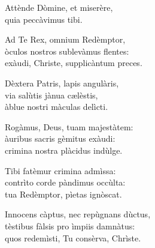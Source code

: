 
\strofa Attènde Dòmine, et miserère,\\
quia peccàvimus tibi.

\spazio


\spazio

\strofa Ad Te Rex, omnium Redèmptor,\\
òculos nostros sublevàmus flentes:\\
exàudi, Christe, supplicàntum preces.

\spazio


\spazio

\strofa Dèxtera Patris, lapis angulàris,\\
via salùtis jànua c\ae lèstis,\\
àblue nostri màculas delìcti.

\spazio


\spazio

\strofa Rogàmus, Deus, tuam majestàtem:\\
àuribus sacris gèmitus exàudi:\\
crimina nostra plàcidus indùlge.

\spazio


\spazio

\strofa Tibi fatèmur crimina admìssa:\\
contrìto corde pàndimus occùlta:\\
tua Redèmptor, pìetas ignòscat.

\spazio


\spazio

\strofa Innocens càptus, nec repùgnans dùctus,\\
tèstibus fàlsis pro ìmpiis damnàtus:\\
quos redemìsti, Tu consèrva, Chrìste.

\spazio

